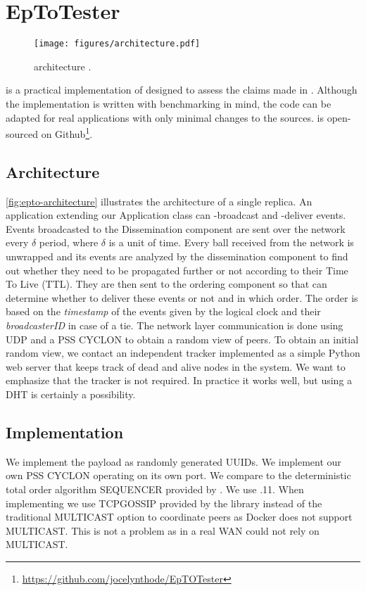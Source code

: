 \section{EpToTester}
\label{sec:epto}
\begin{figure}[htp]
	\texttt{[image: figures/architecture.pdf]}
	\caption{\epto architecture \autocite{matos2015epto}.}
	\label{fig:epto-architecture}
\end{figure}
\eptotester is a practical implementation of \epto designed to assess the claims made in \autocite{matos2015epto}. Although the implementation is written with benchmarking in mind, the code can be adapted for real applications with only minimal changes to the sources. \eptotester is open-sourced on Github\footnote{\href{https://github.com/jocelynthode/EpTOTester}{https://github.com/jocelynthode/EpTOTester}}.
\subsection{Architecture}
\autoref{fig:epto-architecture} illustrates the architecture of a single replica. An application extending our Application class can \epto-broadcast and \epto-deliver events. Events broadcasted to the Dissemination component are sent over the network every $\delta$ period, where $\delta$ is a unit of time. Every ball received from the network is unwrapped and its events are analyzed by the dissemination component to find out whether they need to be propagated further or not according to their Time To Live (TTL). They are then sent to the ordering component so that \epto can determine whether to deliver these events or not and in which order. The order is based on the \textit{timestamp} of the events given by the logical clock and their \textit{broadcasterID} in case of a tie. The network layer communication is done using UDP and a PSS CYCLON to obtain a random view of peers. To obtain an initial random view, we contact an independent tracker implemented as a simple Python web server that keeps track of dead and alive nodes in the system. We want to emphasize that the tracker is not required. In practice it works well, but using a DHT is certainly a possibility.
\subsection{Implementation}
We implement the payload as randomly generated UUIDs. We implement our own PSS CYCLON operating on its own port.  We compare \epto to the deterministic total order algorithm SEQUENCER provided by \jgroups. We use .11. When implementing \jgroups we use TCPGOSSIP provided by the \jgroups library instead of the traditional MULTICAST option to coordinate peers as Docker does not support MULTICAST. This is not a problem as in a real WAN \jgroups could not rely on MULTICAST.
